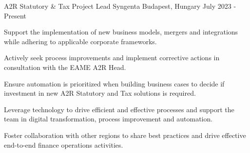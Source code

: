 


\begin{cventries}


  \cventry
    {A2R Statutory \& Tax Project Lead} %
    {Syngenta} %
    {Budapest, Hungary} %
    {July 2023 - Present} %
    {
      \begin{cvitems} %
        \item {Support the implementation of new business models, mergers and integrations while adhering to applicable corporate frameworks.}
        \item {Actively seek process improvements and implement corrective actions in consultation with the EAME A2R Head.}
        \item {Ensure automation is prioritized when building business cases to decide if investment in new A2R Statutory and Tax solutions is required.}
        \item {Leverage technology to drive efficient and effective processes and support the team in digital transformation, process improvement and automation.}
        \item {Foster collaboration with other regions to share best practices and drive effective end-to-end finance operations activities.}
      \end{cvitems}
    }


\end{cventries}
